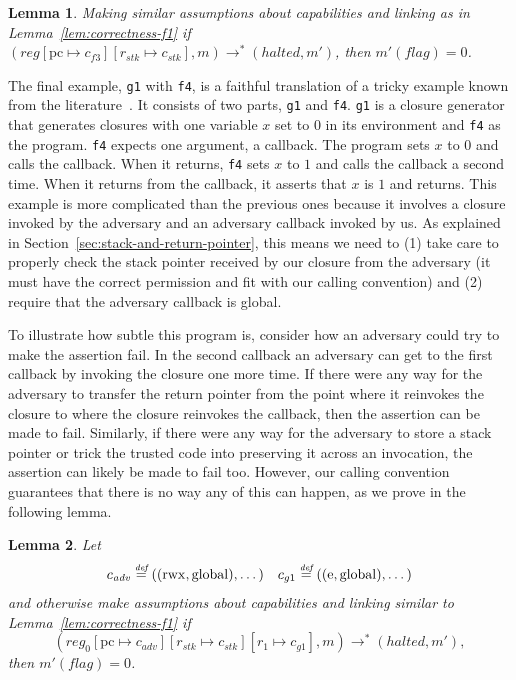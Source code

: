 \documentclass[compsoc,conference,letterpaper,fleqn]{IEEEtran}
\newtheorem{lemma}{Lemma}
\newcommand{\update}[2]{[#1 \mapsto #2]}
\newcommand{\defeq}{\stackrel{\textit{\tiny{def}}}{=}}
\newcommand{\var}[1]{\mathit{#1}}
\newcommand{\pcreg}{\mathrm{pc}}
\newcommand{\reg}{\var{reg}}
\newcommand{\adv}{\var{adv}}
\newcommand{\stk}{\var{stk}}
\newcommand{\flag}{\var{flag}}
\newcommand{\halted}{\mathit{halted}}
\newcommand{\plainperm}[1]{\mathrm{#1}}
\newcommand{\entry}{\plainperm{e}}
\newcommand{\rwx}{\plainperm{rwx}}
\newcommand{\glob}{\plainperm{global}}
\newcommand{\step}[1][]{\rightarrow_{#1}}
\begin{document}
\begin{lemma}
  \label{lem:correctness-f3}
  Making similar assumptions about capabilities and linking as in
  Lemma~\ref{lem:correctness-f1}
  if $(\reg\update{\pcreg}{c_{f3}}\update{r_\stk}{c_\stk},m) \step^*
  (\halted,m')$, then $m'(\flag) = 0$.
\end{lemma}

The final example, \texttt{\footnotesize{g1}} with \texttt{\footnotesize{f4}}, is a faithful translation
of a tricky example known from the
literature~\citep{pitts_operational_1998,Dreyer:jfp12}. It consists of two
parts, \texttt{\footnotesize{g1}} and \texttt{\footnotesize{f4}}. \texttt{\footnotesize{g1}} is a closure generator that
generates closures with one variable $x$ set to $0$ in its environment and
\texttt{\footnotesize{f4}} as the program. \texttt{\footnotesize{f4}} expects one argument, a callback. The
program sets $x$ to $0$ and calls the callback. When it returns, \texttt{\footnotesize{f4}}
sets $x$ to $1$ and calls the callback a second time. When it returns from the
callback, it asserts that $x$ is $1$ and returns. This example is more
complicated than the previous ones because it involves a closure invoked by the
adversary and an adversary callback invoked by us. As explained in
Section~\ref{sec:stack-and-return-pointer}, this means we need to (1) take care
to properly check the stack pointer received by our closure from the adversary
(it must have the correct permission and fit with our calling convention) and (2)
require that the adversary callback is global.

To illustrate how subtle this program is, consider how an adversary could try to
make the assertion fail. In the second callback an adversary can get to the
first callback by invoking the closure one more time. If there were any way for
the adversary to transfer the return pointer from the point where it reinvokes
the closure to where the closure reinvokes the callback, then the assertion can
be made to fail. Similarly, if there were any way for the adversary to store a
stack pointer or trick the trusted code into preserving it across an invocation,
the assertion can likely be made to fail too. However, our calling convention
guarantees that there is no way any of this can happen, as we prove in the
following lemma.

\begin{lemma}
  \label{lem:correctness-g1}
  Let
\[
    \begin{array}{r@{}lr@{}l}
    c_{\var{adv}} & \;\defeq ((\rwx,\glob),\dots) & c_{g1} & \;\defeq ((\entry,\glob),\dots)
    \end{array}
\]
  and otherwise make assumptions about capabilities and linking similar to Lemma~\ref{lem:correctness-f1} 
  if
  \[
  (\reg_0\update{\pcreg}{c_\adv}\update{r_\stk}{c_\stk}\update{r_1}{c_{g1}},m) \step^* (\halted,m'),
  \]
  then $m'(\flag) = 0$.
\end{lemma}
\end{document}

